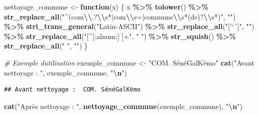 \documentclass[
]{article}
\newenvironment{Shaded}{\begin{snugshade}}{\end{snugshade}}
\newcommand{\CommentTok}[1]{\textcolor[rgb]{0.56,0.35,0.01}{\textit{#1}}}
\newcommand{\ControlFlowTok}[1]{\textcolor[rgb]{0.13,0.29,0.53}{\textbf{#1}}}
\newcommand{\FunctionTok}[1]{\textcolor[rgb]{0.13,0.29,0.53}{\textbf{#1}}}
\newcommand{\NormalTok}[1]{#1}
\newcommand{\OtherTok}[1]{\textcolor[rgb]{0.56,0.35,0.01}{#1}}
\newcommand{\SpecialCharTok}[1]{\textcolor[rgb]{0.81,0.36,0.00}{\textbf{#1}}}
\newcommand{\StringTok}[1]{\textcolor[rgb]{0.31,0.60,0.02}{#1}}
\begin{document}
\begin{Shaded}
\begin{Highlighting}[]
\NormalTok{nettoyage\_commune }\OtherTok{\textless{}{-}} \ControlFlowTok{function}\NormalTok{(x) \{}
\NormalTok{  x }\SpecialCharTok{\%\textgreater{}\%}
    \FunctionTok{tolower}\NormalTok{() }\SpecialCharTok{\%\textgreater{}\%}
    \FunctionTok{str\_replace\_all}\NormalTok{(}\StringTok{"\^{}(com}\SpecialCharTok{\textbackslash{}\textbackslash{}}\StringTok{.?}\SpecialCharTok{\textbackslash{}\textbackslash{}}\StringTok{s*|com}\SpecialCharTok{\textbackslash{}\textbackslash{}}\StringTok{s+|commune}\SpecialCharTok{\textbackslash{}\textbackslash{}}\StringTok{s*(de)?}\SpecialCharTok{\textbackslash{}\textbackslash{}}\StringTok{s*)"}\NormalTok{, }\StringTok{""}\NormalTok{) }\SpecialCharTok{\%\textgreater{}\%}
    \FunctionTok{stri\_trans\_general}\NormalTok{(}\StringTok{"Latin{-}ASCII"}\NormalTok{) }\SpecialCharTok{\%\textgreater{}\%}
    \FunctionTok{str\_replace\_all}\NormalTok{(}\StringTok{"[\textquotesingle{}’‘´\textasciigrave{}]"}\NormalTok{, }\StringTok{""}\NormalTok{) }\SpecialCharTok{\%\textgreater{}\%}
    \FunctionTok{str\_replace\_all}\NormalTok{(}\StringTok{"[\^{}[:alnum:] ]+"}\NormalTok{, }\StringTok{" "}\NormalTok{) }\SpecialCharTok{\%\textgreater{}\%}
    \FunctionTok{str\_squish}\NormalTok{() }\SpecialCharTok{\%\textgreater{}\%}
    \FunctionTok{str\_replace\_all}\NormalTok{(}\StringTok{" "}\NormalTok{, }\StringTok{""}\NormalTok{)}
\NormalTok{\}}

\CommentTok{\# Exemple d\textquotesingle{}utilisation}
\NormalTok{exemple\_commune }\OtherTok{\textless{}{-}} \StringTok{"COM. SénéGalKèmo"}
\FunctionTok{cat}\NormalTok{(}\StringTok{"Avant nettoyage : "}\NormalTok{, exemple\_commune, }\StringTok{"}\SpecialCharTok{\textbackslash{}n}\StringTok{"}\NormalTok{)}
\end{Highlighting}
\end{Shaded}

\begin{verbatim}
## Avant nettoyage :  COM. SénéGalKèmo
\end{verbatim}

\begin{Shaded}
\begin{Highlighting}[]
\FunctionTok{cat}\NormalTok{(}\StringTok{"Après nettoyage : "}\NormalTok{, }\FunctionTok{nettoyage\_commune}\NormalTok{(exemple\_commune), }\StringTok{"}\SpecialCharTok{\textbackslash{}n}\StringTok{"}\NormalTok{)}
\end{Highlighting}
\end{Shaded}
\end{document}
